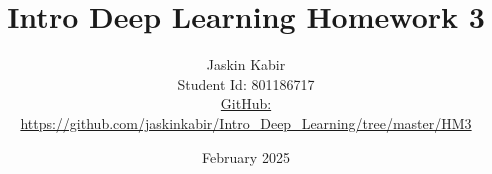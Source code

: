 \centering

\title{\Huge Intro Deep Learning Homework 3}

\author{ \huge
Jaskin Kabir \\
\Large Student Id: 801186717 \\
\Large \href{https://github.com/jaskinkabir/Intro_Deep_Learning/tree/master/HM3}{GitHub:}\\\url{https://github.com/jaskinkabir/Intro_Deep_Learning/tree/master/HM3}
}

\date{February 2025}

\begin{titlingpage}
\maketitle
\end{titlingpage}